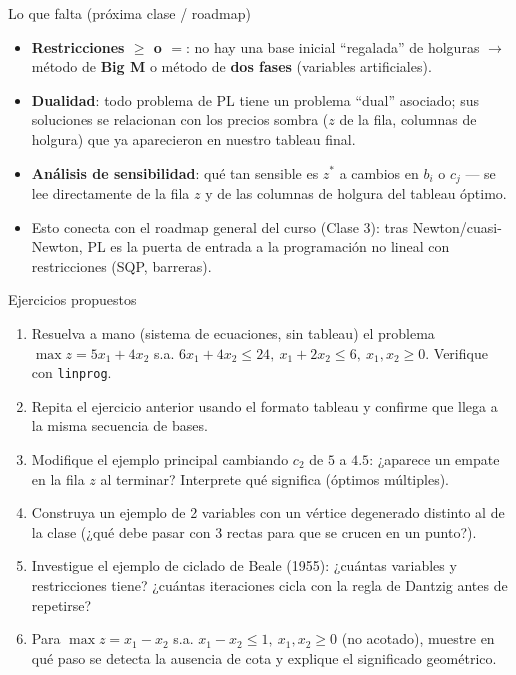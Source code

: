\documentclass[aspectratio=169]{beamer}
\begin{document}
\begin{frame}{Lo que falta (próxima clase / roadmap)}
\begin{itemize}
\item \textbf{Restricciones $\geq$ o $=$}: no hay una base inicial ``regalada'' de holguras $\to$ método de \textbf{Big M} o método de \textbf{dos fases} (variables artificiales).
\item \textbf{Dualidad}: todo problema de PL tiene un problema ``dual'' asociado; sus soluciones se relacionan con los precios sombra ($z$ de la fila, columnas de holgura) que ya aparecieron en nuestro tableau final.
\item \textbf{Análisis de sensibilidad}: qué tan sensible es $z^\ast$ a cambios en $b_i$ o $c_j$ --- se lee directamente de la fila $z$ y de las columnas de holgura del tableau óptimo.
\item Esto conecta con el roadmap general del curso (Clase 3): tras Newton/cuasi-Newton, PL es la puerta de entrada a la programación no lineal con restricciones (SQP, barreras).
\end{itemize}
\end{frame}

\begin{frame}{Ejercicios propuestos}
\small
\begin{enumerate}
\setlength{\itemsep}{2pt}
\item Resuelva a mano (sistema de ecuaciones, sin tableau) el problema $\max z=5x_1+4x_2$ s.a. $6x_1+4x_2\leq24,\ x_1+2x_2\leq6,\ x_1,x_2\geq0$. Verifique con \texttt{linprog}.
\item Repita el ejercicio anterior usando el formato tableau y confirme que llega a la misma secuencia de bases.
\item Modifique el ejemplo principal cambiando $c_2$ de $5$ a $4.5$: ¿aparece un empate en la fila $z$ al terminar? Interprete qué significa (óptimos múltiples).
\item Construya un ejemplo de 2 variables con un vértice degenerado distinto al de la clase (¿qué debe pasar con 3 rectas para que se crucen en un punto?).
\item Investigue el ejemplo de ciclado de Beale (1955): ¿cuántas variables y restricciones tiene? ¿cuántas iteraciones cicla con la regla de Dantzig antes de repetirse?
\item Para $\max z=x_1-x_2$ s.a. $x_1-x_2\leq1,\ x_1,x_2\geq0$ (no acotado), muestre en qué paso se detecta la ausencia de cota y explique el significado geométrico.
\end{enumerate}
\end{frame}
\end{document}
